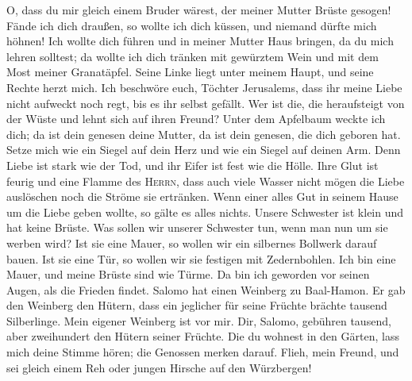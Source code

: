  O, dass du mir gleich einem Bruder wärest, der meiner
Mutter Brüste gesogen! Fände ich dich draußen, so wollte ich dich
küssen, und niemand dürfte mich höhnen!  Ich wollte dich
führen und in meiner Mutter Haus bringen, da du mich lehren solltest; da
wollte ich dich tränken mit gewürztem Wein und mit dem Most meiner
Granatäpfel.  Seine Linke liegt unter meinem Haupt, und
seine Rechte herzt mich.  Ich beschwöre euch, Töchter
Jerusalems, dass ihr meine Liebe nicht aufweckt noch regt, bis es ihr
selbst gefällt.  Wer ist die, die heraufsteigt von der
Wüste und lehnt sich auf ihren Freund? Unter dem Apfelbaum weckte ich
dich; da ist dein genesen deine Mutter, da ist dein genesen, die dich
geboren hat.  Setze mich wie ein Siegel auf dein Herz und
wie ein Siegel auf deinen Arm. Denn Liebe ist stark wie der Tod, und ihr
Eifer ist fest wie die Hölle. Ihre Glut ist feurig und eine Flamme des
\textsc{Herrn},  dass auch viele Wasser nicht mögen die
Liebe auslöschen noch die Ströme sie ertränken. Wenn einer alles Gut in
seinem Hause um die Liebe geben wollte, so gälte es alles nichts.
 Unsere Schwester ist klein und hat keine Brüste. Was
sollen wir unserer Schwester tun, wenn man nun um sie werben wird?
 Ist sie eine Mauer, so wollen wir ein silbernes Bollwerk
darauf bauen. Ist sie eine Tür, so wollen wir sie festigen mit
Zedernbohlen.  Ich bin eine Mauer, und meine Brüste sind
wie Türme. Da bin ich geworden vor seinen Augen, als die Frieden findet.
 Salomo hat einen Weinberg zu Baal-Hamon. Er gab den
Weinberg den Hütern, dass ein jeglicher für seine Früchte brächte
tausend Silberlinge.  Mein eigener Weinberg ist vor mir.
Dir, Salomo, gebühren tausend, aber zweihundert den Hütern seiner
Früchte.  Die du wohnest in den Gärten, lass mich deine
Stimme hören; die Genossen merken darauf.  Flieh, mein
Freund, und sei gleich einem Reh oder jungen Hirsche auf den Würzbergen!
